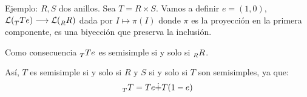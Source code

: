 Ejemplo: \(R, S\) dos anillos. Sea \(T=R\times S\). Vamos a definir
\(e=(1,0)\), \(\mathcal{L}(\prescript{}{T}{Te})\longrightarrow
\mathcal{L}(\prescript{}{R}{R})\) dada por \(I\mapsto\pi(I)\) donde
\(\pi\) es la proyección en la primera componente, es una biyección que
preserva la inclusión.

Como consecuencia \(\prescript{}{T}{Te}\) es semisimple si y solo si
\(\prescript{}{R}{R}\).

Así, \(T\) es semisimple si y solo si \(R\) y \(S\) si y solo si \(T\)
son semisimples, ya que:
\[
  \prescript{}{T}{T}=Te\dot{+}T(1-e)
\]

